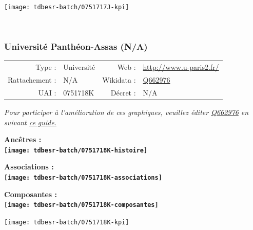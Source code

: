 \documentclass[12pt,french,]{article}
\begin{document}
\begin{center}\texttt{[image: tdbesr-batch/0751717J-kpi]} \end{center}\checkoddpage

\ifoddpage ~\newpage \fi   

\hypertarget{universituxe9-panthuxe9on-assas-na}{%
\subsubsection{Université Panthéon-Assas
(N/A)}\label{universituxe9-panthuxe9on-assas-na}}

\begin{tabular*}{\textwidth}{rp{5cm}rl}  
\hline  
Type : & Université & Web : &\href{http://www.u-paris2.fr/}{http://www.u-paris2.fr/} \\  
Rattachement : & N/A & Wikidata : & \href{https://www.wikidata.org/entity/Q662976}{Q662976} \\  
UAI : & 0751718K & Décret : & N/A \\  
\hline  
\end{tabular*}

\textit{\scriptsize Pour participer à l'amélioration de ces graphiques, veuillez éditer  \href{https://www.wikidata.org/entity/Q662976}{Q662976}  en suivant \href{https://github.com/cpesr/wikidataESR/blob/master/Rmd/wikidataESR.md}{ce guide.}}

\vspace{1cm}  
\begin{minipage}[b]{0.50\textwidth}\begin{center} \bf Ancêtres : \\  
\texttt{[image: tdbesr-batch/0751718K-histoire]} \end{center}\end{minipage}\begin{minipage}[b]{0.50\textwidth}\begin{center} \bf Associations : \\  
\texttt{[image: tdbesr-batch/0751718K-associations]} \end{center}\end{minipage}

\hrulefill

\begin{center} \bf Composantes : \\  
\texttt{[image: tdbesr-batch/0751718K-composantes]} \end{center}

\begin{center}\texttt{[image: tdbesr-batch/0751718K-kpi]} \end{center}\checkoddpage
\end{document}
